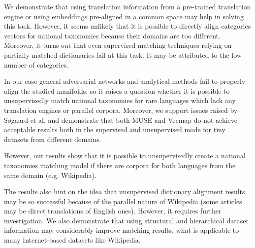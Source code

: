 \documentclass[11pt,a4paper]{article}
\begin{document}
We demonstrate that using translation information from a pre-trained translation engine or using embeddings pre-aligned in a common space may help in solving this task. However, it seems unlikely that it is possible to directly align categories vectors for national taxonomies because their domains are too different. Moreover, it turns out that even supervised matching techniques relying on partially matched dictionaries fail at this task. It may be attributed to the low number of categories.

In our case general adversarial networks and analytical methods fail to properly align the studied manifolds, so it raises a question whether it is possible to unsupervisedly match national taxonomies for rare languages which lack any translation engines or parallel corpora. Moreover, we support issues raised by Søgaard et al. \cite{ruder-muse-limitations} and demonstrate that both MUSE and Vecmap do not achieve acceptable results both in the supervised and unsupervised mode for tiny datasets from different domains.

However, our results show that it is possible to unsupervisedly create a national taxonomies matching model if there are corpora for both languages from the same domain (e.g. Wikipedia).

The results also hint on the idea that unsupervised dictionary alignment results may be so successful because of the parallel nature of Wikipedia (some articles may be direct translations of English ones). However, it requires further investigation.
We also demonstrate that using structural and hierarchical dataset information may considerably improve matching results, what is applicable to many Internet-based datasets like Wikipedia.




\end{document}
